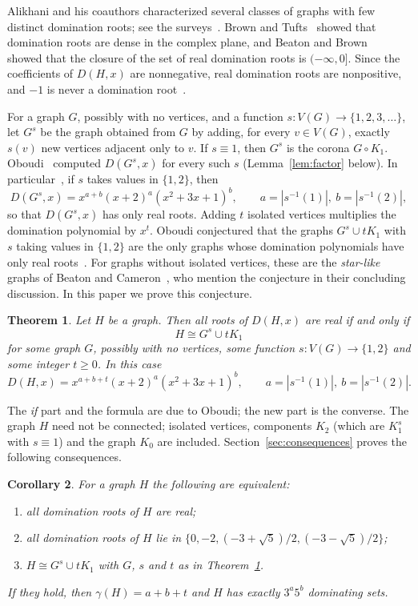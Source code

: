 \documentclass{amsart}
\newtheorem{theorem}{Theorem}[section]
\newtheorem{corollary}[theorem]{Corollary}
\theoremstyle{definition}
\theoremstyle{remark}
\numberwithin{equation}{section}
\begin{document}
Alikhani and his coauthors characterized several classes of graphs with few distinct domination roots; see the surveys~\cite{Ali11s,Ali13}. Brown and Tufts~\cite{BT14} showed that domination roots are dense in the complex plane, and Beaton and Brown~\cite{BB21} showed that the closure of the set of real domination roots is $(-\infty,0]$. Since the coefficients of $D(H,x)$ are nonnegative, real domination roots are nonpositive, and $-1$ is never a domination root~\cite{Obo16}.

For a graph $G$, possibly with no vertices, and a function $s\colon V(G)\to\{1,2,3,\dots\}$, let $G^s$ be the graph obtained from $G$ by adding, for every $v\in V(G)$, exactly $s(v)$ new vertices adjacent only to $v$. If $s\equiv 1$, then $G^s$ is the corona $G\circ K_1$. Oboudi~\cite[Theorem~3]{Obo16} computed $D(G^s,x)$ for every such $s$ (Lemma~\ref{lem:factor} below). In particular~\cite[Theorem~4]{Obo16}, if $s$ takes values in $\{1,2\}$, then
\begin{equation}\label{eq:formula}
D(G^s,x)=x^{a+b}(x+2)^a(x^2+3x+1)^b,\qquad a=|s^{-1}(1)|,\ b=|s^{-1}(2)|,
\end{equation}
so that $D(G^s,x)$ has only real roots. Adding $t$ isolated vertices multiplies the domination polynomial by $x^t$. Oboudi conjectured that the graphs $G^s\cup tK_1$ with $s$ taking values in $\{1,2\}$ are the only graphs whose domination polynomials have only real roots~\cite[Conjecture~1]{Obo16}. For graphs without isolated vertices, these are the \emph{star-like} graphs of Beaton and Cameron~\cite{BC24}, who mention the conjecture in their concluding discussion. In this paper we prove this conjecture.

\begin{theorem}\label{thm:main}
Let $H$ be a graph. Then all roots of $D(H,x)$ are real if and only if
\[
H\cong G^s\cup tK_1
\]
for some graph $G$, possibly with no vertices, some function $s\colon V(G)\to\{1,2\}$ and some integer $t\ge 0$. In this case
\[
D(H,x)=x^{a+b+t}(x+2)^a(x^2+3x+1)^b,\qquad a=|s^{-1}(1)|,\ b=|s^{-1}(2)|.
\]
\end{theorem}

The \emph{if} part and the formula are due to Oboudi; the new part is the converse. The graph $H$ need not be connected; isolated vertices, components $K_2$ (which are $K_1^s$ with $s\equiv1$) and the graph $K_0$ are included. Section~\ref{sec:consequences} proves the following consequences.

\begin{corollary}\label{cor:equiv}
For a graph $H$ the following are equivalent:
\begin{enumerate}
\item[(a)] all domination roots of $H$ are real;
\item[(b)] all domination roots of $H$ lie in $\{0,-2,(-3+\sqrt5)/2,(-3-\sqrt5)/2\}$;
\item[(c)] $H\cong G^s\cup tK_1$ with $G$, $s$ and $t$ as in Theorem~\ref{thm:main}.
\end{enumerate}
If they hold, then $\gamma(H)=a+b+t$ and $H$ has exactly $3^a5^b$ dominating sets.
\end{corollary}
\end{document}
